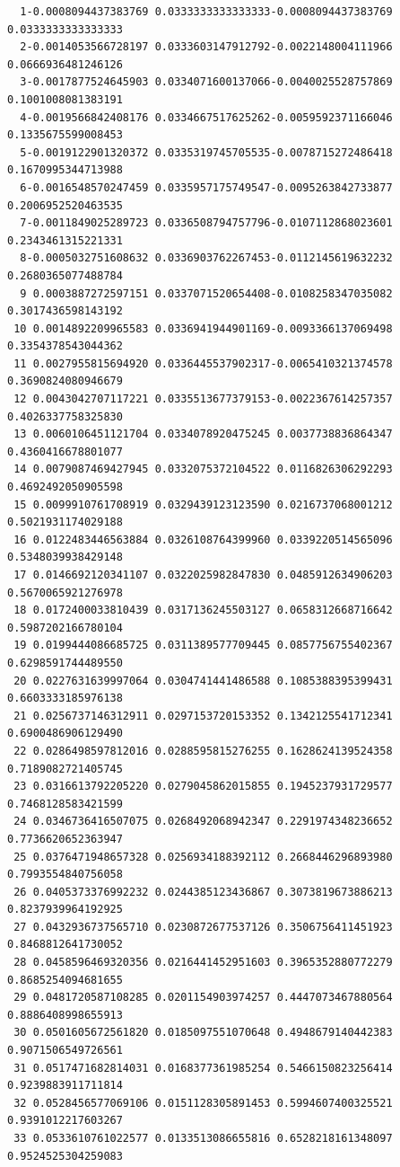 \begin{verbatim}
  1-0.0008094437383769 0.0333333333333333-0.0008094437383769 0.0333333333333333
  2-0.0014053566728197 0.0333603147912792-0.0022148004111966 0.0666936481246126
  3-0.0017877524645903 0.0334071600137066-0.0040025528757869 0.1001008081383191
  4-0.0019566842408176 0.0334667517625262-0.0059592371166046 0.1335675599008453
  5-0.0019122901320372 0.0335319745705535-0.0078715272486418 0.1670995344713988
  6-0.0016548570247459 0.0335957175749547-0.0095263842733877 0.2006952520463535
  7-0.0011849025289723 0.0336508794757796-0.0107112868023601 0.2343461315221331
  8-0.0005032751608632 0.0336903762267453-0.0112145619632232 0.2680365077488784
  9 0.0003887272597151 0.0337071520654408-0.0108258347035082 0.3017436598143192
 10 0.0014892209965583 0.0336941944901169-0.0093366137069498 0.3354378543044362
 11 0.0027955815694920 0.0336445537902317-0.0065410321374578 0.3690824080946679
 12 0.0043042707117221 0.0335513677379153-0.0022367614257357 0.4026337758325830
 13 0.0060106451121704 0.0334078920475245 0.0037738836864347 0.4360416678801077
 14 0.0079087469427945 0.0332075372104522 0.0116826306292293 0.4692492050905598
 15 0.0099910761708919 0.0329439123123590 0.0216737068001212 0.5021931174029188
 16 0.0122483446563884 0.0326108764399960 0.0339220514565096 0.5348039938429148
 17 0.0146692120341107 0.0322025982847830 0.0485912634906203 0.5670065921276978
 18 0.0172400033810439 0.0317136245503127 0.0658312668716642 0.5987202166780104
 19 0.0199444086685725 0.0311389577709445 0.0857756755402367 0.6298591744489550
 20 0.0227631639997064 0.0304741441486588 0.1085388395399431 0.6603333185976138
 21 0.0256737146312911 0.0297153720153352 0.1342125541712341 0.6900486906129490
 22 0.0286498597812016 0.0288595815276255 0.1628624139524358 0.7189082721405745
 23 0.0316613792205220 0.0279045862015855 0.1945237931729577 0.7468128583421599
 24 0.0346736416507075 0.0268492068942347 0.2291974348236652 0.7736620652363947
 25 0.0376471948657328 0.0256934188392112 0.2668446296893980 0.7993554840756058
 26 0.0405373376992232 0.0244385123436867 0.3073819673886213 0.8237939964192925
 27 0.0432936737565710 0.0230872677537126 0.3506756411451923 0.8468812641730052
 28 0.0458596469320356 0.0216441452951603 0.3965352880772279 0.8685254094681655
 29 0.0481720587108285 0.0201154903974257 0.4447073467880564 0.8886408998655913
 30 0.0501605672561820 0.0185097551070648 0.4948679140442383 0.9071506549726561
 31 0.0517471682814031 0.0168377361985254 0.5466150823256414 0.9239883911711814
 32 0.0528456577069106 0.0151128305891453 0.5994607400325521 0.9391012217603267
 33 0.0533610761022577 0.0133513086655816 0.6528218161348097 0.9524525304259083

\end{verbatim}
